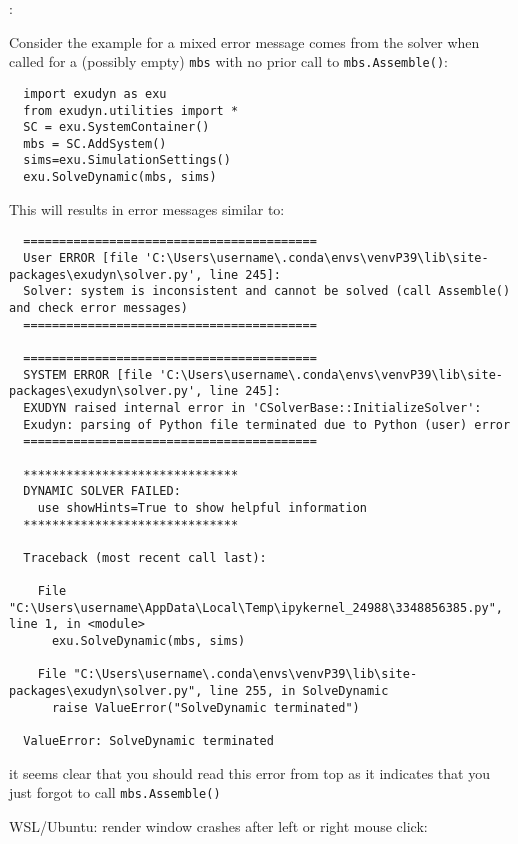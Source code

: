 \noindent {}:
\bi
\item Consider the  example for a mixed error message comes from the solver when called for a (possibly empty) \texttt{mbs} with no prior call to \texttt{mbs.Assemble()}:
\plainlststyle
\begin{lstlisting}
  import exudyn as exu
  from exudyn.utilities import *
  SC = exu.SystemContainer()
  mbs = SC.AddSystem()
  sims=exu.SimulationSettings()
  exu.SolveDynamic(mbs, sims)
\end{lstlisting}
\item This will results in error messages similar to:
\begin{lstlisting}
  =========================================
  User ERROR [file 'C:\Users\username\.conda\envs\venvP39\lib\site-packages\exudyn\solver.py', line 245]: 
  Solver: system is inconsistent and cannot be solved (call Assemble() and check error messages)
  =========================================

  =========================================
  SYSTEM ERROR [file 'C:\Users\username\.conda\envs\venvP39\lib\site-packages\exudyn\solver.py', line 245]: 
  EXUDYN raised internal error in 'CSolverBase::InitializeSolver':
  Exudyn: parsing of Python file terminated due to Python (user) error
  =========================================

  ******************************
  DYNAMIC SOLVER FAILED:
    use showHints=True to show helpful information
  ******************************
   
  Traceback (most recent call last):

    File "C:\Users\username\AppData\Local\Temp\ipykernel_24988\3348856385.py", line 1, in <module>
      exu.SolveDynamic(mbs, sims)

    File "C:\Users\username\.conda\envs\venvP39\lib\site-packages\exudyn\solver.py", line 255, in SolveDynamic
      raise ValueError("SolveDynamic terminated")

  ValueError: SolveDynamic terminated
\end{lstlisting}
\onlyRST{\rstStartNewLine}
\bi
\item[$\ra$] it seems clear that you should read this error from top as it indicates that you just forgot to call \texttt{mbs.Assemble()}
\ei
\item WSL/Ubuntu: render window crashes after left or right mouse click:

